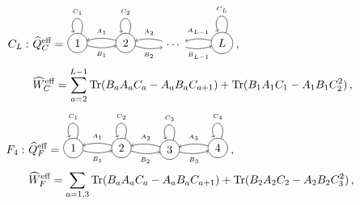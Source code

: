 \documentclass[12pt,a4paper]{article}
\renewcommand{\(}{\left(}
\renewcommand{\)}{\right)}
\renewcommand{\(}{\left(}
\renewcommand{\)}{\right)}
\begin{document}
{\small
\begin{equation}\label{eq:triple_C}
\begin{aligned}
C_L:\ &\widehat{Q}^{\text{eff}}_C=\begin{tikzpicture}[baseline={([yshift=-3ex]current bounding box.center)},vertex/.style={anchor=base,
			circle,fill=black!25,minimum size=18pt,inner sep=2pt}]
\node (v1) at (-3,0.2)[circle,draw] {1};
\node (v2) at (-1.5,0.2)[circle,draw] {2};
\node (e) at (0,0.15) {$\dots$};
\node (vl) at (1.5,0.2)[circle,draw] {$L$};

\draw[->] (v2) edge [bend right=15] node[above] {{\tiny $A_1$}} (v1);
\draw[->] (v1) edge [bend right=15] node[below] {{\tiny $B_1$}} (v2);
\draw (v1) edge [in=110,out=70,loop] node [above]{{\tiny $C_1$}} (v1);
			
\draw[->] (v2) edge [bend right=15] node[below] {{\tiny $B_2$}} (e);
\draw[->] (e) edge [bend right=15] node[above] {{\tiny $A_2$}} (v2);
\draw (v2) edge [in=110,out=70,loop] node[above] {{\tiny $C_2$}} (v2);
			
\draw[->] (e) edge [bend right=15] node[below] {{\tiny $B_{L-1}$}} (vl);
\draw[->] (vl) edge [bend right=15] node[above] {{\tiny $A_{L-1}$}} (e);
\draw (vl) edge [in=110,out=70,loop] node[above] {{\tiny $C_{L}$}} (vl);
	\end{tikzpicture}\,,\\
&\widehat{W}_C^{\text{eff}}=\sum_{a=2}^{L-1}\text{Tr}(B_aA_aC_a-A_aB_aC_{a+1})+\text{Tr}(B_{1}A_{1}C_{1}-A_{1}B_{1}C_2^2)\,,
\end{aligned}
\end{equation}}
{\small
\begin{equation}\label{eq:triple_F}
\begin{aligned}
F_4:\ &\widehat{Q}^{\text{eff}}_F=\begin{tikzpicture}[baseline={([yshift=-3ex]current bounding box.center)},vertex/.style={anchor=base,
			circle,fill=black!25,minimum size=18pt,inner sep=2pt}]
\node (v1) at (-3,0.2)[circle,draw] {1};
\node (v2) at (-1.5,0.2)[circle,draw] {2};
\node (v3) at (0,0.15) [circle,draw] {3};
\node (v4) at (1.5,0.2)[circle,draw] {4};

\draw[->] (v2) edge [bend right=15] node[above] {{\tiny $A_1$}} (v1);
\draw[->] (v1) edge [bend right=15] node[below] {{\tiny $B_1$}} (v2);
\draw (v1) edge [in=110,out=70,loop] node [above]{{\tiny $C_1$}} (v1);
			
\draw[->] (v2) edge [bend right=15] node[below] {{\tiny $B_2$}} (v3);
\draw[->] (v3) edge [bend right=15] node[above] {{\tiny $A_2$}} (v2);
\draw (v2) edge [in=110,out=70,loop] node[above] {{\tiny $C_2$}} (v2);

\draw[->] (v3) edge [bend right=15] node[below] {{\tiny $B_3$}} (v4);
\draw[->] (v4) edge [bend right=15] node[above] {{\tiny $A_3$}} (v3);
\draw (v3) edge [in=110,out=70,loop] node[above] {{\tiny $C_3$}} (v3);

\draw (v4) edge [in=110,out=70,loop] node[above] {{\tiny $C_4$}} (v4);
\end{tikzpicture}\,,\\
&\widehat{W}_F^{\text{eff}}=\sum_{a=1,3}\text{Tr}(B_aA_aC_a-A_aB_aC_{a+1})+\text{Tr}(B_{2}A_{2}C_{2}-A_{2}B_{2}C_3^2)\,,
\end{aligned}
\end{equation}}
\end{document}
